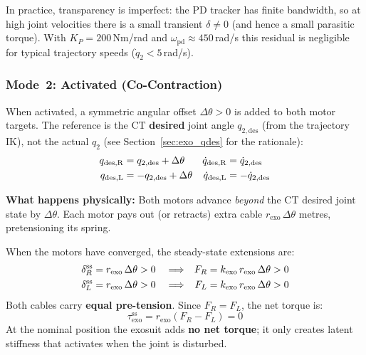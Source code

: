 \documentclass[11pt,a4paper]{article}
\begin{document}
In practice, transparency is imperfect: the PD tracker has finite bandwidth,
so at high joint velocities there is a small transient $\delta \neq 0$ (and
hence a small parasitic torque).  With $K_P = 200$\,Nm/rad and
$\omega_{\mathrm{pd}} \approx 450$\,rad/s this residual is negligible for
typical trajectory speeds ($\dot{q}_2 < 5$\,rad/s).


\subsubsection{Mode~2: Activated (Co-Contraction)}
\label{sec:exo_activated}

When activated, a symmetric angular offset $\Delta\theta > 0$ is added to
both motor targets.  The reference is the CT \textbf{desired} joint angle
$q_{2,\mathrm{des}}$ (from the trajectory IK), not the actual $q_2$
(see Section~\ref{sec:exo_qdes} for the rationale):
\begin{align}
    q_{\mathrm{des,R}} &=  q_{2,\mathrm{des}} + \Delta\theta  &  \dot{q}_{\mathrm{des,R}} &=  \dot{q}_{2,\mathrm{des}} \notag\\
    q_{\mathrm{des,L}} &= -q_{2,\mathrm{des}} + \Delta\theta  &  \dot{q}_{\mathrm{des,L}} &= -\dot{q}_{2,\mathrm{des}}
\label{eq:exo_activated}
\end{align}

\textbf{What happens physically:}
Both motors advance \emph{beyond} the CT desired joint state by
$\Delta\theta$.  Each motor pays out (or retracts) extra cable
$r_{\mathrm{exo}}\,\Delta\theta$ metres, pretensioning its spring.

When the motors have converged, the steady-state extensions are:
\begin{align}
    \delta_R^{\mathrm{ss}} &= r_{\mathrm{exo}}\,\Delta\theta > 0
        & &\Longrightarrow & F_R &= k_{\mathrm{exo}}\,r_{\mathrm{exo}}\,\Delta\theta > 0 \notag\\
    \delta_L^{\mathrm{ss}} &= r_{\mathrm{exo}}\,\Delta\theta > 0
        & &\Longrightarrow & F_L &= k_{\mathrm{exo}}\,r_{\mathrm{exo}}\,\Delta\theta > 0
\label{eq:pretension}
\end{align}
Both cables carry \textbf{equal pre-tension}.  Since $F_R = F_L$, the net
torque is:
\[
    \tau_{\mathrm{exo}}^{\mathrm{ss}}
      = r_{\mathrm{exo}}(F_R - F_L) = 0
\]
At the nominal position the exosuit adds \textbf{no net torque}; it only
creates latent stiffness that activates when the joint is disturbed.
\end{document}
